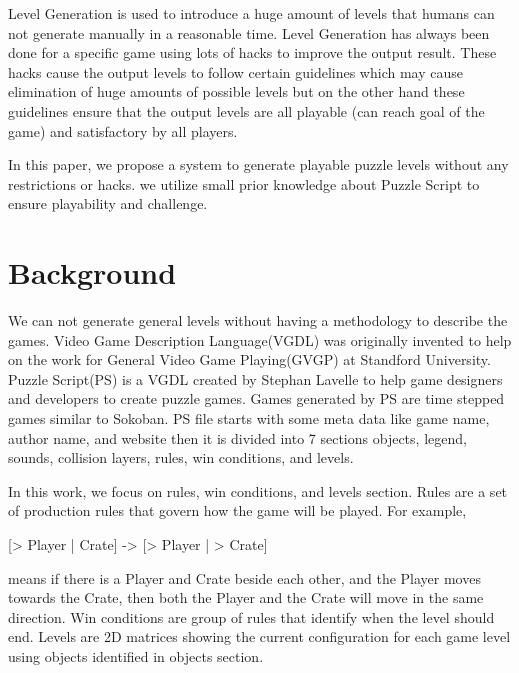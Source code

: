 \documentclass[letterpaper]{article}
\begin{document}
Level Generation is used to introduce a huge amount of levels that humans can not generate manually in a reasonable time. Level Generation has always been done for a specific game using lots of hacks to improve the output result. These hacks cause the output levels to follow certain guidelines which may cause elimination of huge amounts of possible levels but on the other hand these guidelines ensure that the output levels are all playable (can reach goal of the game) and satisfactory by all players\cite{mcGenerateEverything}.\\\par

In this paper, we propose a system to generate playable puzzle levels without any restrictions or hacks. we utilize small prior knowledge about Puzzle Script to ensure playability and challenge.

\section{Background}
We can not generate general levels without having a methodology to describe the games. Video Game Description Language(VGDL) was originally invented to help on the work for General Video Game Playing(GVGP)\cite{gvgp} at Standford University. Puzzle Script(PS) is a VGDL created by Stephan Lavelle to help game designers and developers to create puzzle games\cite{puzzleScript}. Games generated by PS are time stepped games similar to Sokoban\cite{sokoban}. PS file starts with some meta data like game name, author name, and website then it is divided into 7 sections objects, legend, sounds, collision layers, rules, win conditions, and levels.\\\par

In this work, we focus on rules, win conditions, and levels section. Rules are a set of production rules that govern how the game will be played. For example, \begin{center}[> Player | Crate] -> [> Player | > Crate]\end{center} means if there is a Player and Crate beside each other, and the Player moves towards the Crate, then both the Player and the Crate will move in the same direction. Win conditions are group of rules that identify when the level should end. Levels are 2D matrices showing the current configuration for each game level using objects identified in objects section.
\end{document}
